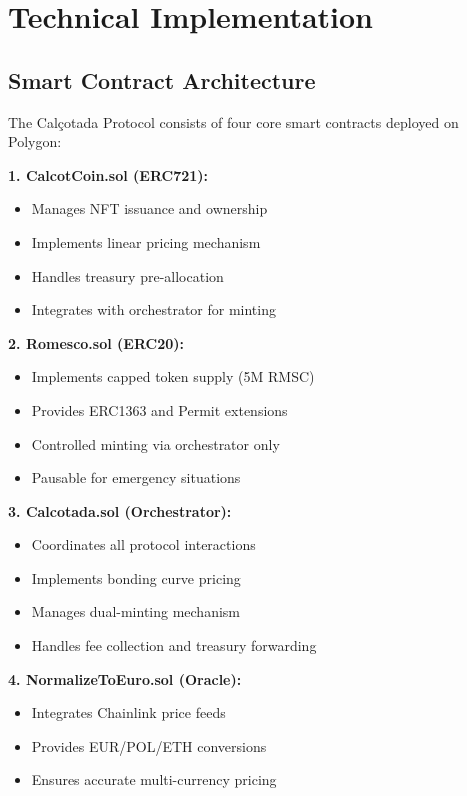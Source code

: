 \documentclass[conference]{IEEEtran}
\begin{document}
\section{Technical Implementation}

\subsection{Smart Contract Architecture}

The Calçotada Protocol consists of four core smart contracts deployed on Polygon:

\textbf{1. CalcotCoin.sol (ERC721):}
\begin{itemize}
    \item Manages NFT issuance and ownership
    \item Implements linear pricing mechanism
    \item Handles treasury pre-allocation
    \item Integrates with orchestrator for minting
\end{itemize}

\textbf{2. Romesco.sol (ERC20):}
\begin{itemize}
    \item Implements capped token supply (5M RMSC)
    \item Provides ERC1363 and Permit extensions
    \item Controlled minting via orchestrator only
    \item Pausable for emergency situations
\end{itemize}

\textbf{3. Calcotada.sol (Orchestrator):}
\begin{itemize}
    \item Coordinates all protocol interactions
    \item Implements bonding curve pricing
    \item Manages dual-minting mechanism
    \item Handles fee collection and treasury forwarding
\end{itemize}

\textbf{4. NormalizeToEuro.sol (Oracle):}
\begin{itemize}
    \item Integrates Chainlink price feeds
    \item Provides EUR/POL/ETH conversions
    \item Ensures accurate multi-currency pricing
\end{itemize}
\end{document}
